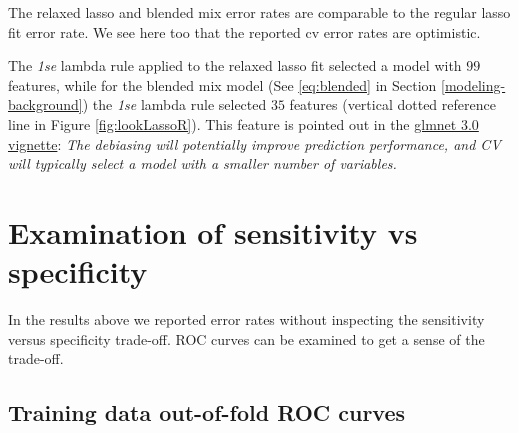 \documentclass[
]{book}
\newenvironment{Shaded}{\begin{snugshade}}{\end{snugshade}}
\newcommand{\CommentTok}[1]{\textcolor[rgb]{0.56,0.35,0.01}{\textit{#1}}}
\newcommand{\DataTypeTok}[1]{\textcolor[rgb]{0.13,0.29,0.53}{#1}}
\newcommand{\FloatTok}[1]{\textcolor[rgb]{0.00,0.00,0.81}{#1}}
\newcommand{\KeywordTok}[1]{\textcolor[rgb]{0.13,0.29,0.53}{\textbf{#1}}}
\newcommand{\NormalTok}[1]{#1}
\newcommand{\OperatorTok}[1]{\textcolor[rgb]{0.81,0.36,0.00}{\textbf{#1}}}
\newcommand{\StringTok}[1]{\textcolor[rgb]{0.31,0.60,0.02}{#1}}
\begin{document}
The relaxed lasso and blended mix error rates are comparable to the
regular lasso fit error rate. We see here too that the reported cv
error rates are optimistic.

The \emph{1se} lambda rule applied to the relaxed lasso fit selected a model with
\(99\) features,
while for the blended mix model
(See \eqref{eq:blended} in Section \ref{modeling-background})
the \emph{1se} lambda rule selected
\(35\) features (vertical
dotted reference line in Figure \ref{fig:lookLassoR}).
This feature is pointed out in the
\href{https://cran.r-project.org/web/packages/glmnet/vignettes/relax.pdf}{glmnet 3.0 vignette}:
\emph{The debiasing will potentially improve prediction performance,
and CV will typically select a model with a smaller number of variables.}

\hypertarget{examination-of-sensitivity-vs-specificity}{%
\section{Examination of sensitivity vs specificity}\label{examination-of-sensitivity-vs-specificity}}

In the results above we reported error rates without inspecting the
sensitivity versus specificity trade-off. ROC curves can be examined
to get a sense of the trade-off.

\hypertarget{training-data-out-of-fold-roc-curves}{%
\subsection{Training data out-of-fold ROC curves}\label{training-data-out-of-fold-roc-curves}}

\begin{Shaded}
\end{Shaded}
\end{document}
